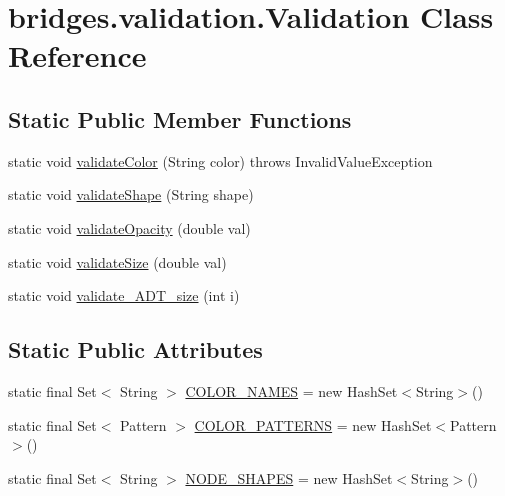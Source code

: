 \hypertarget{classbridges_1_1validation_1_1_validation}{}\section{bridges.\+validation.\+Validation Class Reference}
\label{classbridges_1_1validation_1_1_validation}
\subsection*{Static Public Member Functions}
\begin{DoxyCompactItemize}
\item 
static void \hyperlink{classbridges_1_1validation_1_1_validation_ae529d673f5b86b457ed7b7d4d80a9dbf}{validate\+Color} (String color)  throws Invalid\+Value\+Exception
\item 
static void \hyperlink{classbridges_1_1validation_1_1_validation_a81a0f7eda485bb1c2d786d78936ca4b9}{validate\+Shape} (String shape)
\item 
static void \hyperlink{classbridges_1_1validation_1_1_validation_ab6cd587755b3128031da73a35895f666}{validate\+Opacity} (double val)
\item 
static void \hyperlink{classbridges_1_1validation_1_1_validation_ad031369dbb08eadfc698e5e9e7e59605}{validate\+Size} (double val)
\item 
static void \hyperlink{classbridges_1_1validation_1_1_validation_a0a3b322af9a6815fd1acba481858d0e3}{validate\+\_\+\+A\+D\+T\+\_\+size} (int i)
\end{DoxyCompactItemize}
\subsection*{Static Public Attributes}
\begin{DoxyCompactItemize}
\item 
static final Set$<$ String $>$ \hyperlink{classbridges_1_1validation_1_1_validation_a580ab67e2b85bc3ee6ee8af138180624}{C\+O\+L\+O\+R\+\_\+\+N\+A\+M\+E\+S} = new Hash\+Set$<$String$>$()
\item 
static final Set$<$ Pattern $>$ \hyperlink{classbridges_1_1validation_1_1_validation_a16e87ec9f7fe5ef76aea76277a612c76}{C\+O\+L\+O\+R\+\_\+\+P\+A\+T\+T\+E\+R\+N\+S} = new Hash\+Set$<$Pattern$>$()
\item 
static final Set$<$ String $>$ \hyperlink{classbridges_1_1validation_1_1_validation_a43f1f9efc20d0086b7fcfa9b40bd7146}{N\+O\+D\+E\+\_\+\+S\+H\+A\+P\+E\+S} = new Hash\+Set$<$String$>$()
\end{DoxyCompactItemize}


